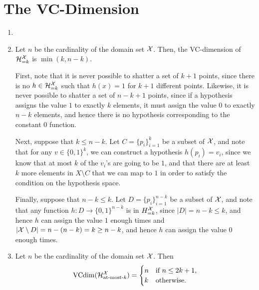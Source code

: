 \chapter{The VC-Dimension}

\begin{ex}
\end{ex}

\begin{ex}
  \begin{enumerate}
    \item[]
    \item Let $n$ be the cardinality of the domain set $\mathcal{X}$. Then, the
          VC-dimension of $\mathcal{H}^{\mathcal{X}}_{=k}$ is $\min(k, n-k)$.

          First, note that it is never possible to shatter a set of $k+1$ points, since there is no
          $h\in\mathcal{H}^{\mathcal{X}}_{=k}$ such that $h(x)=1$ for $k+1$ different points. Likewise,
          it is never possible to shatter a set of $n-k+1$ points, since if a
          hypothesis assigns the value $1$ to exactly $k$ elements, it must assign
          the value $0$ to exactly $n-k$ elements, and hence there is no hypothesis
          corresponding to the constant $0$ function.

          Next, suppose that $k\leq n-k$. Let $C=\{p_i\}_{i=1}^k$ be a subset of $\mathcal{X}$,
          and note that for any $v\in\{0,1\}^k$, we can construct a hypothesis $h(p_i)=v_i$, since we
          know that at most $k$ of the $v_i$'s are going to be $1$, and that there are
          at least $k$ more elements in $X\setminus C$ that we can map to $1$ in order to
          satisfy the condition on the hypothesis space.

          Finally, suppose that $n-k\leq k$. Let $D=\{p_i\}_{i=1}^{n-k}$ be a subset of $\mathcal{X}$,
          and note that any function $h:D\to \{0,1\}^{n-k}$ is in $H^{\mathcal{X}}_{=k}$, since
          $|D|=n-k\leq k$, and hence $h$ can assign the value $1$ enough times and
          $|\mathcal{X}\setminus D|=n-(n-k)=k\geq n-k$, and hence $h$ can assign the value $0$
          enough times.
    \item Let $n$ be the cardinality of the domain set $\mathcal{X}$. Then
          \begin{align*}
            \operatorname*{VCdim}(\mathcal{H}^{\mathcal{X}}_{\text{at-most-$k$}})=\begin{cases}
              n & \text{if $n\leq 2k+1$}, \\
              k & \text{otherwise}.
            \end{cases}
          \end{align*}


\end{enumerate}
\end{ex}
